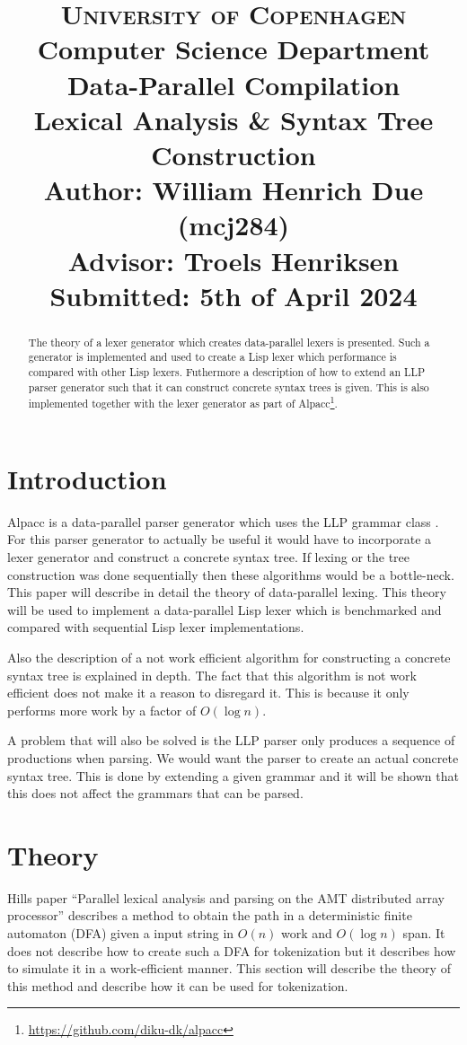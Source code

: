 \documentclass[a4paper,12pt]{article}
\title{
    {\Large \textsc{University of Copenhagen}} \\[0pt]
    {\large Computer Science Department} \\[10pt]
    {\Large Data-Parallel Compilation} \\[4pt]
    {\large Lexical Analysis \& Syntax Tree Construction} \\[10pt]
    Author: William Henrich Due (mcj284) \\[0pt]
    Advisor: Troels Henriksen \\[0pt]
    Submitted: 5th of April 2024
}
\author{}
\date{}
\theoremstyle{definition}
\begin{document}
\maketitle
\thispagestyle{firstpage}
\begin{abstract}
    \noindent The theory of a lexer generator which creates data-parallel lexers is presented. Such a generator is implemented and used to create a Lisp lexer which performance is compared with other Lisp lexers. Futhermore a description of how to extend an LLP parser generator such that it can construct concrete syntax trees is given. This is also implemented together with the lexer generator as part of Alpacc\footnote{\href{https://github.com/diku-dk/alpacc}{https://github.com/diku-dk/alpacc}}.
\end{abstract}

\tableofcontents

\section{Introduction}
Alpacc is a data-parallel parser generator which uses the LLP grammar class \cite{Vagner2007}. For this parser generator to actually be useful it would have to incorporate a lexer generator and construct a concrete syntax tree. If lexing or the tree construction was done sequentially then these algorithms would be a bottle-neck. This paper will describe in detail the theory of data-parallel lexing. This theory will be used to implement a data-parallel Lisp lexer which is benchmarked and compared with sequential Lisp lexer implementations.

Also the description of a not work efficient algorithm for constructing a concrete syntax tree is explained in depth. The fact that this algorithm is not work efficient does not make it a reason to disregard it. This is because it only performs more work by a factor of $O(\log n)$.

A problem that will also be solved is the LLP parser only produces a sequence of productions when parsing. We would want the parser to create an actual concrete syntax tree. This is done by extending a given grammar and it will be shown that this does not affect the grammars that can be parsed.

\section{Theory}
Hills paper ``Parallel lexical analysis and parsing on the AMT
distributed array processor'' \cite{HILL1992699} describes a method to obtain the path in a deterministic finite automaton (DFA) given a input string in $O(n)$ work and $O(\log n)$ span. It does not describe how to create such a DFA for tokenization but it describes how to simulate it in a work-efficient manner. This section will describe the theory of this method and describe how it can be used for tokenization.
\end{document}
